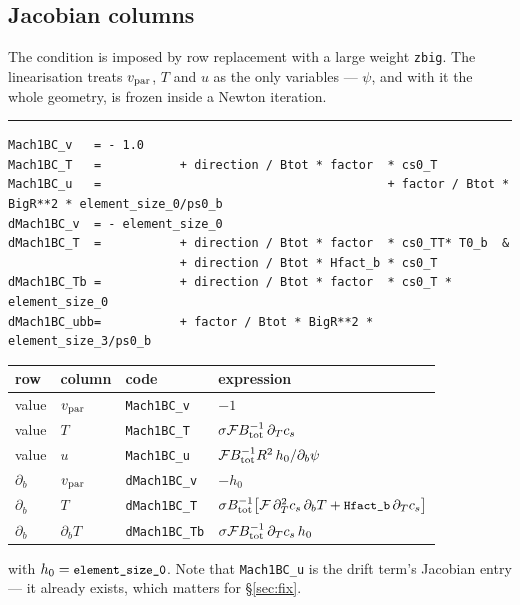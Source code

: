 \documentclass[11pt,a4paper]{article}
\newenvironment{codeline}[1]
  {\par\medskip\noindent\textcolor{coderule}{\rule{\linewidth}{0.4pt}}\par
   \nopagebreak\noindent{\ttfamily\footnotesize\textcolor{keyc}{#1}}\par\nopagebreak\smallskip}
  {\par\medskip}
\newcommand{\code}[1]{\texttt{\small #1}}
\begin{document}
\subsection{Jacobian columns}

The condition is imposed by row replacement with a large weight \code{zbig}.  The linearisation
treats $v_{\rm par}$, $T$ and $u$ as the only variables --- $\psi$, and with it the whole
geometry, is frozen inside a Newton iteration.

\begin{codeline}{mod\_boundary\_conditions.f90:618--620, 623--630, 656}
\begin{lstlisting}
Mach1BC_v   = - 1.0
Mach1BC_T   =           + direction / Btot * factor  * cs0_T
Mach1BC_u   =                                        + factor / Btot * BigR**2 * element_size_0/ps0_b
dMach1BC_v  = - element_size_0
dMach1BC_T  =           + direction / Btot * factor  * cs0_TT* T0_b  &
                        + direction / Btot * Hfact_b * cs0_T
dMach1BC_Tb =           + direction / Btot * factor  * cs0_T * element_size_0
dMach1BC_ubb=           + factor / Btot * BigR**2 * element_size_3/ps0_b
\end{lstlisting}
\end{codeline}

\begin{center}
\begin{tabular}{llll}
\toprule
row & column & code & expression \\
\midrule
value & $v_{\rm par}$ & \code{Mach1BC\_v}    & $-1$ \\
value & $T$           & \code{Mach1BC\_T}    & $\sigma\mathcal{F}B_{\rm tot}^{-1}\,\partial_T c_s$ \\
value & $u$           & \code{Mach1BC\_u}    & $\mathcal{F}B_{\rm tot}^{-1}R^2\,h_0/\partial_b\psi$ \\
$\partial_b$ & $v_{\rm par}$ & \code{dMach1BC\_v}  & $-h_0$ \\
$\partial_b$ & $T$           & \code{dMach1BC\_T}  & $\sigma B_{\rm tot}^{-1}\bigl[\mathcal{F}\,\partial^2_T c_s\,\partial_b T + \code{Hfact\_b}\,\partial_T c_s\bigr]$ \\
$\partial_b$ & $\partial_b T$& \code{dMach1BC\_Tb} & $\sigma\mathcal{F}B_{\rm tot}^{-1}\,\partial_T c_s\, h_0$ \\
\bottomrule
\end{tabular}
\end{center}

\noindent with $h_0 = \code{element\_size\_0}$.  Note that \code{Mach1BC\_u} is the drift
term's Jacobian entry --- it already exists, which matters for \S\ref{sec:fix}.
\end{document}
